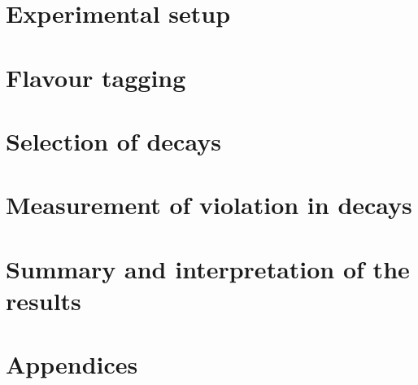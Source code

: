 \chapter{Experimental setup}
\clearpage



\chapter{Flavour tagging}
\clearpage


\chapter{Selection of  decays}
\clearpage



\chapter{Measurement of  violation in  decays}
\clearpage



\chapter{Summary and interpretation of the results}
\clearpage



\newpage

\backmatter
\appendix


\chapter{Appendices}
\renewcommand{\thesection}{\Alph{section}}

\fancyhead[RO]{\bfseries \nouppercase{\rightmark}}


\newpage

\newpage

\newpage

\newpage

\newpage

\newpage

\newpage

\newpage

\newpage

\newpage

\newpage

\newpage


